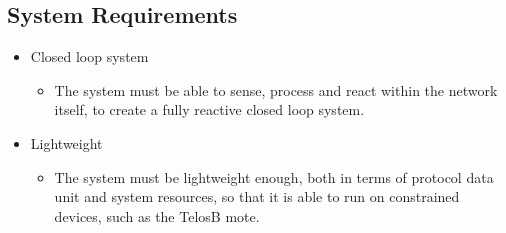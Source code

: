 \subsection{System Requirements} %
\label{sub:system_requirements}
\begin{itemize}
	\item Closed loop system
	\begin{itemize}
		\item The system must be able to sense, process and react within the network itself, to create a fully reactive closed loop system.
	\end{itemize}
	\item Lightweight
	\begin{itemize}
		\item The system must be lightweight enough, both in terms of protocol data unit and system resources, so that it is able to run on constrained devices, such as the TelosB mote.
	\end{itemize}


\end{itemize}
